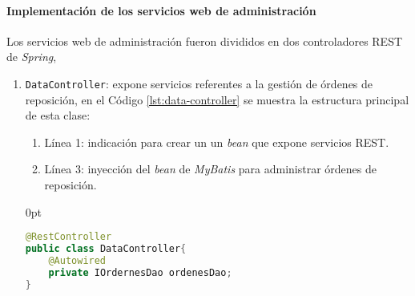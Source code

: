 \paragraph{\noindent Implementación de los servicios web de administración\\}
Los servicios web de administración fueron divididos en dos controladores REST de \textit{Spring}, 
\begin{enumerate}
	\item \texttt{DataController}: expone servicios referentes a la gestión de órdenes de reposición, en el Código \ref{lst:data-controller} se muestra la estructura principal de esta clase:
	\begin{enumerate}
		\item Línea 1: indicación para crear un un \textit{bean} que expone servicios REST.
		\item Línea 3: inyección del \textit{bean} de \textit{MyBatis} para administrar órdenes de reposición.
	\end{enumerate}

\begin{adjustwidth}{\listingfixwidth}{0pt}
\begin{lstlisting}[language=Java, caption={Controlador para exponer servicios web de órdenes de reposición.}, captionpos=b, label={lst:data-controller}]
@RestController
public class DataController{
	@Autowired
	private IOrdernesDao ordenesDao;
}
\end{lstlisting}
\end{adjustwidth}


\end{enumerate}
